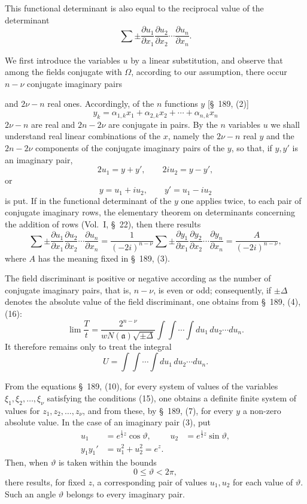\documentclass[11pt]{article}
\begin{document}
This functional determinant is also equal to the reciprocal value of the determinant
\[
\sum\pm
\frac{\partial u_1}{\partial x_1}
\frac{\partial u_2}{\partial x_2}\cdots
\frac{\partial u_n}{\partial x_n}.
\]

We first introduce the variables $u$ by a linear substitution, and observe that among the fields conjugate with $\Omega$, according to our assumption, there occur $n-\nu$ conjugate imaginary pairs

and $2\nu-n$ real ones. Accordingly, of the $n$ functions $y$ [\S~189, (2)]
\begin{equation}
y_k=\alpha_{1,k}x_1+\alpha_{2,k}x_2+\cdots+\alpha_{n,k}x_n
\tag{2}
\end{equation}
$2\nu-n$ are real and $2n-2\nu$ are conjugate in pairs. By the $n$ variables $u$ we shall understand real linear combinations of the $x$, namely the $2\nu-n$ real $y$ and the $2n-2\nu$ components of the conjugate imaginary pairs of the $y$, so that, if $y,y'$ is an imaginary pair,
\[
2u_1=y+y',\qquad 2iu_2=y-y',
\]
or
\begin{equation}
y=u_1+iu_2,
\qquad y'=u_1-iu_2
\tag{3}
\end{equation}
is put. If in the functional determinant of the $y$ one applies twice, to each pair of conjugate imaginary rows, the elementary theorem on determinants concerning the addition of rows (Vol.~I, \S~22), then there results
\[
\sum\pm
\frac{\partial u_1}{\partial x_1}
\frac{\partial u_2}{\partial x_2}\cdots
\frac{\partial u_n}{\partial x_n}
=
\frac1{(-2i)^{n-\nu}}
\sum\pm
\frac{\partial y_1}{\partial x_1}
\frac{\partial y_2}{\partial x_2}\cdots
\frac{\partial y_n}{\partial x_n}
=
\frac{A}{(-2i)^{n-\nu}},
\]
where $A$ has the meaning fixed in \S~189, (3).

The field discriminant is positive or negative according as the number of conjugate imaginary pairs, that is, $n-\nu$, is even or odd; consequently, if $\pm\Delta$ denotes the absolute value of the field discriminant, one obtains from \S~189, (4), (16):
\begin{equation}
\lim\frac{T}{t}
=
\frac{2^{n-\nu}}{wN(\mathfrak a)\sqrt{\pm\Delta}}
\int\!\int\cdots\int du_1\,du_2\cdots du_n.
\tag{4}
\end{equation}
It therefore remains only to treat the integral
\[
U=\int\!\int\cdots\int du_1\,du_2\cdots du_n.
\]

From the equations \S~189, (10), for every system of values of the variables $\xi_1,\xi_2,\ldots,\xi_\nu$ satisfying the conditions (15), one obtains a definite finite system of values for $z_1,z_2,\ldots,z_\nu$, and from these, by \S~189, (7), for every $y$ a non-zero absolute value. In the case of an imaginary pair (3), put
\begin{align}
u_1&=e^{\frac12 z}\cos\vartheta,
&u_2&=e^{\frac12 z}\sin\vartheta,
\tag{5}\\
y_1y_1'&=u_1^2+u_2^2=e^z.
\tag{6}
\end{align}
Then, when $\vartheta$ is taken within the bounds
\[
0\leq\vartheta<2\pi,
\]
there results, for fixed $z$, a corresponding pair of values $u_1,u_2$ for each value of $\vartheta$. Such an angle $\vartheta$ belongs to every imaginary pair.
\end{document}
